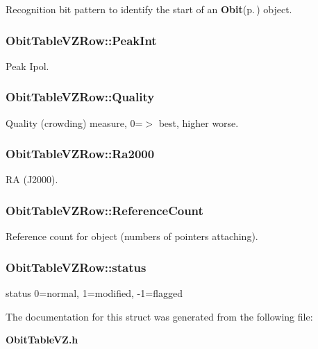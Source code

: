 Recognition bit pattern to identify the start of an {\bf Obit}{\rm (p.\,\pageref{structObit})} object. 

\subsubsection{ {\bf Obit\-Table\-VZRow::Peak\-Int}}\label{structObitTableVZRow_o8}


Peak Ipol. 

\subsubsection{ {\bf Obit\-Table\-VZRow::Quality}}\label{structObitTableVZRow_o9}


Quality (crowding) measure, 0=$>$ best, higher worse. 

\subsubsection{ {\bf Obit\-Table\-VZRow::Ra2000}}\label{structObitTableVZRow_o6}


RA (J2000). 

\subsubsection{ {\bf Obit\-Table\-VZRow::Reference\-Count}}\label{structObitTableVZRow_o2}


Reference count for object (numbers of pointers attaching). 

\subsubsection{ {\bf Obit\-Table\-VZRow::status}}\label{structObitTableVZRow_o10}


status 0=normal, 1=modified, -1=flagged 



The documentation for this struct was generated from the following file:\begin{CompactItemize}
\item 
{\bf Obit\-Table\-VZ.h}\end{CompactItemize}

